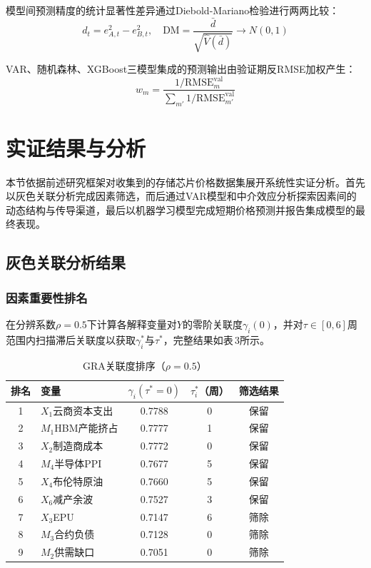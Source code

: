 \documentclass[a4paper,12pt,fontset=fandol]{ctexart}
\begin{document}
模型间预测精度的统计显著性差异通过Diebold-Mariano检验\cite{diebold1995}进行两两比较：
\begin{equation}
d_t = e_{A,t}^2 - e_{B,t}^2,\quad\text{DM}=\frac{\bar{d}}{\sqrt{\hat{V}(\bar{d})}}\to N(0,1)
\end{equation}

VAR、随机森林、XGBoost三模型集成的预测输出由验证期反RMSE加权产生：
\begin{equation}
w_m = \frac{1/\text{RMSE}_m^{\text{val}}}{\sum_{m'}1/\text{RMSE}_{m'}^{\text{val}}}
\end{equation}


\section{实证结果与分析}

本节依据前述研究框架对收集到的存储芯片价格数据集展开系统性实证分析。首先以灰色关联分析完成因素筛选，而后通过VAR模型和中介效应分析探索因素间的动态结构与传导渠道，最后以机器学习模型完成短期价格预测并报告集成模型的最终表现。

\subsection{灰色关联分析结果}

\subsubsection{因素重要性排名}

在分辨系数$\rho=0.5$下计算各解释变量对$Y$的零阶关联度$\gamma_i(0)$，并对$\tau\in[0,6]$周范围内扫描滞后关联度以获取$\gamma_i^*$与$\tau^*$，完整结果如表\,3所示。

\begin{table}[H]
\centering
\renewcommand{\arraystretch}{1.15}
\begin{tabular}{clccc}
\toprule
排名 & 变量 & $\gamma_i(\tau^*\!=\!0)$ & $\tau_i^*$（周） & 筛选结果 \\
\midrule
1 & $X_1$\;云商资本支出 & 0.7788 & 0 & 保留 \\
2 & $M_1$\;HBM产能挤占 & 0.7777 & 1 & 保留 \\
3 & $X_2$\;制造商成本 & 0.7772 & 0 & 保留 \\
4 & $M_4$\;半导体PPI & 0.7677 & 5 & 保留 \\
5 & $X_4$\;布伦特原油 & 0.7660 & 5 & 保留 \\
6 & $X_6$\;减产余波 & 0.7527 & 3 & 保留 \\
\midrule
7 & $X_3$\;EPU & 0.7147 & 6 & 筛除 \\
8 & $M_3$\;合约负债 & 0.7128 & 0 & 筛除 \\
9 & $M_2$\;供需缺口 & 0.7051 & 0 & 筛除 \\
\bottomrule
\end{tabular}
\caption{GRA关联度排序（$\rho=0.5$）}
\label{tab:gra}
\end{table}
\end{document}
